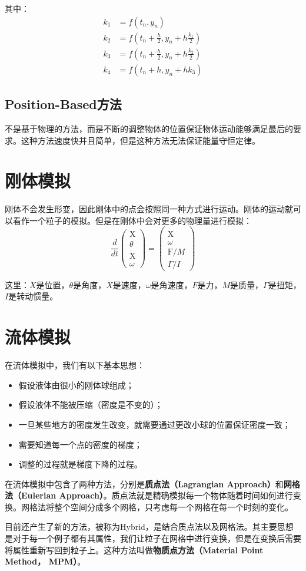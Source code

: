 \documentclass[openany]{progbookcn}
\begin{document}
其中：
\begin{equation}
	\begin{split}
		k_{1} &=f\left(t_{n}, y_{n}\right) \\
		k_{2} &=f\left(t_{n}+\frac{h}{2}, y_{n}+h \frac{k_{1}}{2}\right) \\
		k_{3} &=f\left(t_{n}+\frac{h}{2}, y_{n}+h \frac{k_{2}}{2}\right) \\
		k_{4} &=f\left(t_{n}+h, y_{n}+h k_{3}\right)
	\end{split}
\end{equation}

\subsection{Position-Based方法}

不是基于物理的方法，而是不断的调整物体的位置保证物体运动能够满足最后的要求。这种方法速度快并且简单，但是这种方法无法保证能量守恒定律。

\section{刚体模拟}

刚体不会发生形变，因此刚体中的点会按照同一种方式进行运动。刚体的运动就可以看作一个粒子的模拟。但是在刚体中会对更多的物理量进行模拟：
\begin{equation}
	\frac{d}{d t}\left(\begin{array}{c}
		\mathrm{X} \\
		\theta \\
		\dot{\mathrm{X}} \\
		\omega
	\end{array}\right)=\left(\begin{array}{c}
		\dot{\mathrm{X}} \\
		\omega \\
		\mathrm{F} / M \\
		\Gamma / I
	\end{array}\right)
\end{equation}

这里：$X$是位置，$\theta$是角度，$\dot{X}$是速度，$\omega$是角速度，$F$是力，$M$是质量，$\Gamma$是扭矩，$I$是转动惯量。

\section{流体模拟}

在流体模拟中，我们有以下基本思想：
\begin{itemize}
	\item 假设液体由很小的刚体球组成；
	\item 假设液体不能被压缩（密度是不变的）；
	\item 一旦某些地方的密度发生改变，就需要通过更改小球的位置保证密度一致；
	\item 需要知道每一个点的密度的梯度；
	\item 调整的过程就是梯度下降的过程。
\end{itemize}

在流体模拟中包含了两种方法，分别是\textbf{质点法（Lagrangian Approach）}和\textbf{网格法（Eulerian Approach）}。质点法就是精确模拟每一个物体随着时间如何进行变换。网格法将整个空间分成多个网格，只考虑每一个网格在每一个时刻的变化。

目前还产生了新的方法，被称为Hybrid，是结合质点法以及网格法。其主要思想是对于每一个例子都有其属性，我们让粒子在网格中进行变换，但是在变换后需要将属性重新写回到粒子上。这种方法叫做\textbf{物质点方法（Material Point Method， MPM）}。
\end{document}
